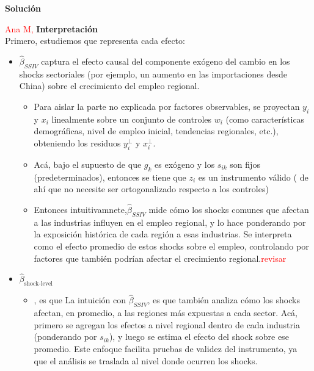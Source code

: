 \documentclass[a4paper, answers, addpoints, 11pt]{exam}
\newenvironment{solucion}{%
  \begin{mdframed}[
    backgroundcolor=blue!5,    %
    linecolor=blue!50,          %
    linewidth=2pt,              %
    leftmargin=10pt,            %
    rightmargin=8pt,           %
    topline=true,              %
    bottomline=true,            %
    roundcorner=10pt,           %
    innerleftmargin=10pt,       %
    innerrightmargin=10pt,      %
    innerbottommargin=10pt,     %
    innertopmargin=10pt         %
  ]%
  \begin{tcolorbox}[colframe=blue!50!black, colback=blue!50, coltitle=white, sharp corners=all, boxrule=1mm, width=\textwidth, halign=left, valign=center, top=0mm, bottom=0mm, left=0mm, right=0mm] \textbf{Solución} \end{tcolorbox} }{\end{mdframed}}
\begin{document}
\begin{enumerate}
\begin{enumerate}[label=\alph*)]
\begin{solucion}
     \textcolor{red}{Ana M,}
        \textbf{Interpretación}\\
        Primero, estudiemos que representa cada efecto:
        \begin{itemize}
            \item $\hat{\beta}_{SSIV}$ captura el efecto causal del componente exógeno del cambio en los shocks sectoriales (por ejemplo, un aumento en las importaciones desde China) sobre el crecimiento del empleo regional.
                  \begin{itemize}
                   \item Para aislar la parte no explicada por factores observables, se proyectan $y_i$ y $x_i$ linealmente sobre un conjunto de controles $w_i$ (como características demográficas, nivel de empleo inicial, tendencias regionales, etc.), obteniendo los residuos $y_i^\perp$ y $x_i^\perp$.
                    \item Acá, bajo el supuesto de que $g_k$ es exógeno y los $s_{ik}$ son fijos (predeterminados), entonces se tiene que $z_i$ es un instrumento válido ( de ahí que no necesite ser ortogonalizado respecto a los controles)
                     \item Entonces intuitivamnete,$\hat{\beta}_{SSIV}$  mide cómo los shocks comunes que afectan a las industrias influyen en el empleo regional, y lo hace ponderando por la exposición histórica de cada región a esas industrias. Se interpreta como el efecto promedio de estos shocks sobre el empleo, controlando por factores que también podrían afectar el crecimiento regional.\textcolor{red}{revisar}
                  \end{itemize}

                 \item  $\hat{\beta}_{\text{shock-level}}$
 \begin{itemize}
                 \item , es que La intuición con $\hat{\beta}_{SSIV}$, es que  también analiza cómo los shocks afectan, en promedio, a las regiones más expuestas a cada sector. Acá, primero se agregan los efectos a nivel regional dentro de cada industria (ponderando por $s_{ik}$), y luego se estima el efecto del shock sobre ese promedio. Este enfoque facilita pruebas de validez del instrumento, ya que el análisis se traslada al nivel donde ocurren los shocks.
                  \end{itemize}
        \end{itemize}
      


\end{solucion}
\end{enumerate}
\end{enumerate}
\end{document}
